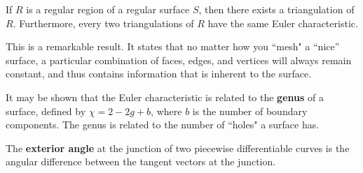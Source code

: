 \begin{theorem}[]\label{}
If $R$ is a regular region of a regular surface $S$, then there exists a triangulation of $R$. Furthermore, every two triangulations of $R$ have the same Euler characteristic.
\end{theorem}

This is a remarkable result. It states that no matter how you ``mesh" a ``nice'' surface, a particular combination of faces, edges, and vertices will always remain constant, and thus contains information that is inherent to the surface.

\begin{remark}[]\label{}
It may be shown that the Euler characteristic is related to the \textbf{genus} of a surface, defined by $\chi = 2 - 2g + b$, where $b$ is the number of boundary components. The genus is related to the number of ``holes" a surface has.
\end{remark}

\begin{definition}[]\label{}
The \textbf{exterior angle} at the junction of two piecewise differentiable curves is the angular difference between the tangent vectors at the junction.
\end{definition}



